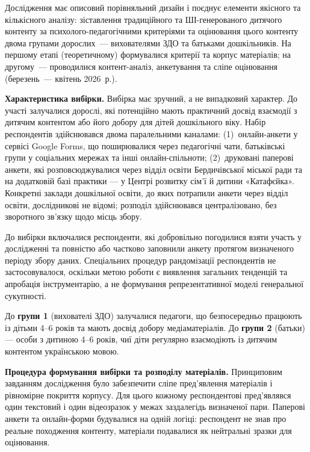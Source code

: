 \documentclass[14pt, a4paper]{extreport}
\begin{document}
Дослідження має описовий порівняльний дизайн і поєднує елементи якісного та кількісного аналізу: зіставлення традиційного та ШІ-генерованого дитячого контенту за психолого-педагогічними критеріями та оцінювання цього контенту двома групами дорослих~--- вихователями ЗДО та батьками дошкільників. На першому етапі (теоретичному) формувалися критерії та корпус матеріалів; на другому~--- проводилися контент-аналіз, анкетування та сліпе оцінювання (березень~--- квітень 2026~р.).

\textbf{Характеристика вибірки.}
Вибірка має зручний, а не випадковий характер. До участі залучалися дорослі, які потенційно мають практичний досвід взаємодії з дитячим контентом або його добору для дітей дошкільного віку. Набір респондентів здійснювався двома паралельними каналами: (1)~онлайн-анкети у сервісі Google Forms, що поширювалися через педагогічні чати, батьківські групи у соціальних мережах та інші онлайн-спільноти; (2)~друковані паперові анкети, які розповсюджувалися через відділ освіти Бердичівської міської ради та на додатковій базі практики --- у Центрі розвитку сім'ї й дитини «Катафєйка». Конкретні заклади дошкільної освіти, до яких потрапили анкети через відділ освіти, дослідникові не відомі; розподіл здійснювався централізовано, без зворотного зв'язку щодо місць збору.

До вибірки включалися респонденти, які добровільно погодилися взяти участь у дослідженні та повністю або частково заповнили анкету протягом визначеного періоду збору даних. Спеціальних процедур рандомізації респондентів не застосовувалося, оскільки метою роботи є виявлення загальних тенденцій та апробація інструментарію, а не формування репрезентативної моделі генеральної сукупності.

До \textbf{групи 1} (вихователі ЗДО) залучалися педагоги, що безпосередньо працюють із дітьми 4--6 років та мають досвід добору медіаматеріалів. До \textbf{групи 2} (батьки) --- особи з дитиною 4--6 років, чиї діти регулярно взаємодіють із дитячим контентом українською мовою.

\textbf{Процедура формування вибірки та розподілу матеріалів.}
Принциповим завданням дослідження було забезпечити сліпе пред'явлення матеріалів і рівномірне покриття корпусу. Для цього кожному респондентові пред'являвся один текстовий і один відеозразок у межах заздалегідь визначеної пари. Паперові анкети та онлайн-форми будувалися на одній логіці: респондент не знав про реальне походження контенту, матеріали подавалися як нейтральні зразки для оцінювання.
\end{document}

